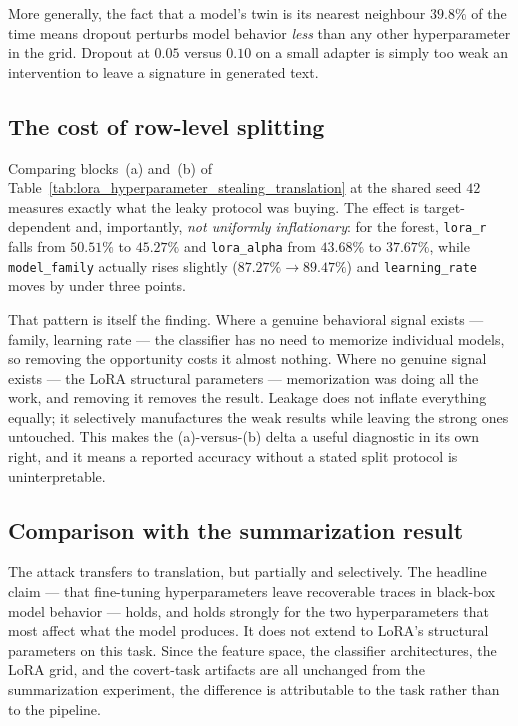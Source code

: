 \documentclass[11pt]{article}
\newcommand{\hd}[1]{\texttt{#1}}
\begin{document}
More generally, the fact that a model's twin is its nearest neighbour $39.8\%$ of the time
means dropout perturbs model behavior \emph{less} than any other hyperparameter in the
grid. Dropout at $0.05$ versus $0.10$ on a small adapter is simply too weak an
intervention to leave a signature in generated text.

\subsection{The cost of row-level splitting}

Comparing blocks~(a) and~(b) of Table~\ref{tab:lora_hyperparameter_stealing_translation}
at the shared seed $42$ measures exactly what the leaky protocol was buying. The effect is
target-dependent and, importantly, \emph{not uniformly inflationary}: for the forest,
\hd{lora\_r} falls from $50.51\%$ to $45.27\%$ and \hd{lora\_alpha} from $43.68\%$ to
$37.67\%$, while \hd{model\_family} actually rises slightly ($87.27\% \to 89.47\%$) and
\hd{learning\_rate} moves by under three points.

That pattern is itself the finding. Where a genuine behavioral signal exists --- family,
learning rate --- the classifier has no need to memorize individual models, so removing
the opportunity costs it almost nothing. Where no genuine signal exists --- the LoRA
structural parameters --- memorization was doing all the work, and removing it removes the
result. Leakage does not inflate everything equally; it selectively manufactures the weak
results while leaving the strong ones untouched. This makes the (a)-versus-(b) delta a
useful diagnostic in its own right, and it means a reported accuracy without a stated
split protocol is uninterpretable.

\subsection{Comparison with the summarization result}

The attack transfers to translation, but partially and selectively. The headline claim ---
that fine-tuning hyperparameters leave recoverable traces in black-box model behavior ---
holds, and holds strongly for the two hyperparameters that most affect what the model
produces. It does not extend to LoRA's structural parameters on this task. Since the
feature space, the classifier architectures, the LoRA grid, and the covert-task artifacts
are all unchanged from the summarization experiment, the difference is attributable to the
task rather than to the pipeline.
\end{document}
